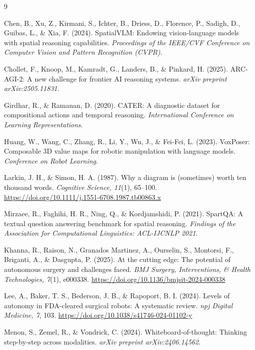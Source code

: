 \documentclass[stu,12pt,a4paper,floatsintext]{apa7}
\begin{document}
\newpage
\begin{thebibliography}{9}

Chen, B., Xu, Z., Kirmani, S., Ichter, B., Driess, D., Florence, P., Sadigh, D., Guibas, L., \& Xia, F. (2024). SpatialVLM: Endowing vision-language models with spatial reasoning capabilities. \emph{Proceedings of the IEEE/CVF Conference on Computer Vision and Pattern Recognition (CVPR)}.

Chollet, F., Knoop, M., Kamradt, G., Landers, B., \& Pinkard, H. (2025). ARC-AGI-2: A new challenge for frontier AI reasoning systems. \emph{arXiv preprint arXiv:2505.11831}.

Girdhar, R., \& Ramanan, D. (2020). CATER: A diagnostic dataset for compositional actions and temporal reasoning. \emph{International Conference on Learning Representations}.

Huang, W., Wang, C., Zhang, R., Li, Y., Wu, J., \& Fei-Fei, L. (2023). VoxPoser: Composable 3D value maps for robotic manipulation with language models. \emph{Conference on Robot Learning}.

Larkin, J. H., \& Simon, H. A. (1987). Why a diagram is (sometimes) worth ten thousand words. \emph{Cognitive Science, 11}(1), 65--100. \url{https://doi.org/10.1111/j.1551-6708.1987.tb00863.x}

Mirzaee, R., Faghihi, H. R., Ning, Q., \& Kordjamshidi, P. (2021). SpartQA: A textual question answering benchmark for spatial reasoning. \emph{Findings of the Association for Computational Linguistics: ACL-IJCNLP 2021}.

Khanna, R., Raison, N., Granados Martinez, A., Ourselin, S., Montorsi, F., Briganti, A., \& Dasgupta, P. (2025). At the cutting edge: The potential of autonomous surgery and challenges faced. \emph{BMJ Surgery, Interventions, \& Health Technologies, 7}(1), e000338. \url{https://doi.org/10.1136/bmjsit-2024-000338}

Lee, A., Baker, T. S., Bederson, J. B., \& Rapoport, B. I. (2024). Levels of autonomy in FDA-cleared surgical robots: A systematic review. \emph{npj Digital Medicine, 7}, 103. \url{https://doi.org/10.1038/s41746-024-01102-y}

Menon, S., Zemel, R., \& Vondrick, C. (2024). Whiteboard-of-thought: Thinking step-by-step across modalities. \emph{arXiv preprint arXiv:2406.14562}.


\end{thebibliography}
\end{document}
